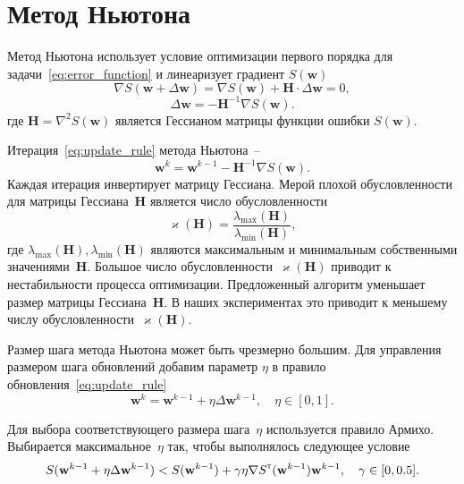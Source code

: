 \documentclass[a4paper,12pt]{article}
\renewcommand{\kappa}{\ensuremath{\varkappa}}
\theoremstyle{plain} %
\theoremstyle{definition} %
\theoremstyle{remark} %
\newcommand{\bw}{\mathbf{w}}
\newcommand{\bH}{\mathbf{H}}
\newcommand{\T}{{\text{\tiny\sffamily\upshape\mdseries T}}}
\begin{document}
	\section*{Метод Ньютона}
	Метод Ньютона использует условие оптимизации первого порядка для задачи~\eqref{eq:error_function} и линеаризует градиент $S (\bw)$
	\[
	\nabla S (\bw + \Delta \bw) = \nabla S(\bw) + \bH \cdot \Delta \bw = 0,
	\]
	\[
	\Delta \bw = - \bH^{-1} \nabla S(\bw).
	\]
	где $\bH = \nabla^2 S(\bw)$ является Гессианом матрицы функции ошибки $S(\bw)$.
	
	Итерация~\eqref{eq:update_rule} метода Ньютона~--
	\[
	\bw^k = \bw^{k-1} - \bH^{-1} \nabla S(\bw).
	\]
	Каждая итерация инвертирует матрицу Гессиана.
	Мерой плохой обусловленности для матрицы Гессиана~$\bH$ является число обусловленности
	\[
	\kappa(\bH) = \frac{\lambda_{\text{max}}(\bH)}{\lambda_{\text{min}}(\bH)},
	\]
	где $\lambda_{\text{max}}(\bH), \lambda_{\text{min}}(\bH)$ являются максимальным и минимальным собственными значениями~$\bH$. Большое число обусловленности~$\kappa (\bH)$ приводит к нестабильности процесса оптимизации.
	Предложенный алгоритм уменьшает размер матрицы Гессиана~$\bH$. В наших экспериментах это приводит к меньшему числу обусловленности~$\kappa (\bH)$.
	
	Размер шага метода Ньютона может быть чрезмерно большим. Для управления размером шага обновлений добавим параметр $\eta$ в правило обновления~\eqref{eq:update_rule}
	\[
	\bw^k = \bw^{k - 1} + \eta \Delta \bw^{k - 1}, \quad \eta \in [0, 1].
	\]
	
	Для выбора соответствующего размера шага~$\eta$ используется правило Армихо. Выбирается максимальное~$\eta$ так, чтобы выполнялось следующее условие
	\[
	S(\bw^{k - 1} + \eta \Delta \bw^{k - 1}) < S(\bw^{k - 1}) + \gamma \eta \nabla S^{\T}(\bw^{k-1})\bw^{k - 1}, \quad \gamma \in [0, 0.5].
	\]
\end{document}
